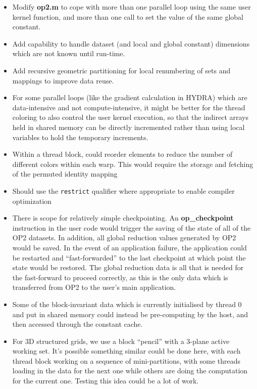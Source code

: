 \documentclass[12pt]{article}
\begin{document}
\begin{itemize}
\item
Modify {\bf op2.m} to cope with more than one parallel loop using
the same user kernel function, and more than one call to set the
value of the same global constant.

\item
Add capability to handle dataset (and local and global constant) dimensions
which are not known until run-time.

\item
Add recursive geometric partitioning for local renumbering of sets and
mappings to improve data reuse.

\item
For some parallel loops (like the gradient calculation in HYDRA)
which are data-intensive and not compute-intensive, it might be better
for the thread coloring to also control the user kernel execution, so
that the indirect arrays held in shared memory can be directly incremented
rather than using local variables to hold the temporary increments.

\item
Within a thread block, could reorder elements to reduce the number of
different colors within each warp.  This would require the storage and
fetching of the permuted identity mapping

\item
Should use the {\tt restrict} qualifier where appropriate to enable
compiler optimization

\item
There is scope for relatively simple checkpointing. An {\bf op\_checkpoint}
instruction in the user code would trigger the saving of the state of all
of the OP2 datasets.  In addition, all global reduction values generated by
OP2 would be saved.  In the event of an application failure, the application
could be restarted and ``fast-forwarded'' to the last checkpoint at which
point the state would be restored.  The global reduction data is all that is
needed for the fast-forward to proceed correctly, as this is the only data
which is transferred from OP2 to the user's main application.

\item
Some of the block-invariant data which is currently initialised by thread 0
and put in shared memory could instead be pre-computing by the host, and
then accessed through the constant cache.

\item
For 3D structured grids, we use a block ``pencil'' with a 3-plane active
working set.  It's possible something similar could be done here, with each
thread block working on a sequence of mini-partitions, with some threads
loading in the data for the next one while others are doing the computation
for the current one.  Testing this idea could be a lot of work.


\end{itemize}
\end{document}
